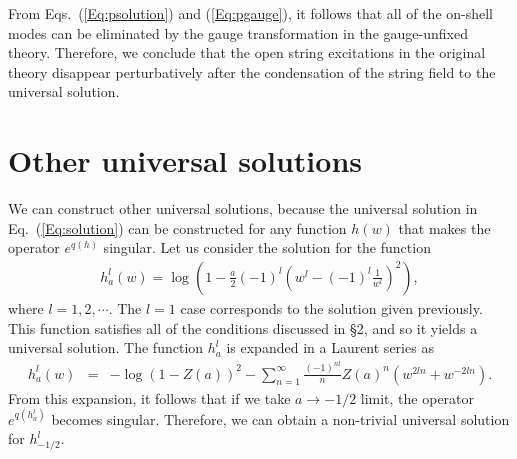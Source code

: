 \documentclass[a4paper,seceq,preprint]{ptptex}
\begin{document}
From Eqs.~(\ref{Eq:psolution}) and (\ref{Eq:pgauge}), it follows that
all of the on-shell modes can be eliminated by the
gauge transformation in the gauge-unfixed theory.
Therefore, we conclude that the open string excitations in
the original theory disappear perturbatively after the condensation of
the string field to the universal solution.



\section{Other universal solutions}

We can construct other universal solutions, because 
the universal solution in Eq.~(\ref{Eq:solution}) can be constructed for 
any function $h(w)$ that makes the operator $e^{q(h)}$ singular. 
Let us consider the solution for the function
\begin{eqnarray}
 h_a^l(w)
= \log\left(1-\frac{a}{2}(-1)^l\left(w^l-(-1)^l\frac{1}{w^l}\right)^2\right),
\end{eqnarray}
where $l=1,2,\cdots$. The $l=1$ case corresponds to
the solution given previously. This function satisfies all of the conditions
discussed in \S 2, and so it yields a universal
solution. 
The function $h_a^l$ is expanded in a Laurent series as
\begin{eqnarray}
 h_a^l(w) &=& -\log(1-Z(a))^2 -\sum_{n=1}^\infty \frac{(-1)^{nl}}{n}
Z(a)^n
\left(w^{2ln}+w^{-2ln}\right).
\end{eqnarray}
From this expansion, it follows that if we 
take $a\rightarrow -1/2$ limit, the operator $e^{q(h_a^l)}$ becomes
singular. Therefore, we can obtain a non-trivial
universal solution for $h_{-1/2}^l$.
\end{document}
